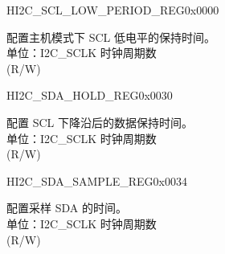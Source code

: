 \begin{register}{H}{I2C\_SCL\_LOW\_PERIOD\_REG}{0x0000}\label{regdesc:I2CSCLLOWPERIODREG}
    \regnewline%
    \begin{regdesc}\begin{reglist}
    \label{fielddesc:I2CSCLLOWPERIOD}\item [I2C\_SCL\_LOW\_PERIOD] 配置主机模式下 SCL 低电平的保持时间。\\
    单位：I2C\_SCLK 时钟周期数 \\ (R/W)
    \end{reglist}\end{regdesc}
    \end{register}


    \begin{register}{H}{I2C\_SDA\_HOLD\_REG}{0x0030}\label{regdesc:I2CSDAHOLDREG}
    \regnewline%
    \begin{regdesc}\begin{reglist}
    \label{fielddesc:I2CSDAHOLDTIME}\item [I2C\_SDA\_HOLD\_TIME] 配置 SCL 下降沿后的数据保持时间。\\
    单位：I2C\_SCLK 时钟周期数 \\ (R/W)
    \end{reglist}\end{regdesc}
    \end{register}


    \begin{register}{H}{I2C\_SDA\_SAMPLE\_REG}{0x0034}\label{regdesc:I2CSDASAMPLEREG}
    \regnewline%
    \begin{regdesc}\begin{reglist}
    \label{fielddesc:I2CSDASAMPLETIME}\item [I2C\_SDA\_SAMPLE\_TIME] 配置采样 SDA 的时间。\\
    单位：I2C\_SCLK 时钟周期数 \\ (R/W)
    \end{reglist}\end{regdesc}
    \end{register}



